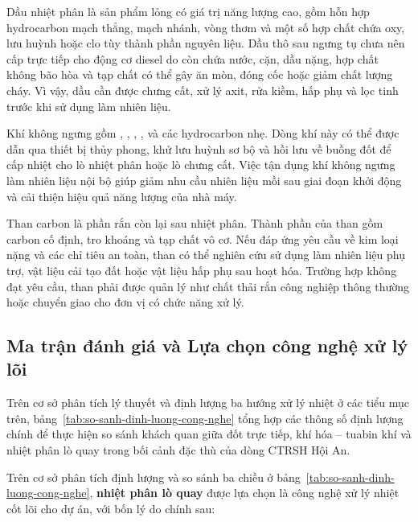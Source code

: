 \documentclass[../main.tex]{subfiles}
\begin{document}
Dầu nhiệt phân là sản phẩm lỏng có giá trị năng lượng cao, gồm hỗn hợp hydrocarbon mạch thẳng, mạch nhánh, vòng thơm và một số hợp chất chứa oxy, lưu huỳnh hoặc clo tùy thành phần nguyên liệu. Dầu thô sau ngưng tụ chưa nên cấp trực tiếp cho động cơ diesel do còn chứa nước, cặn, dầu nặng, hợp chất không bão hòa và tạp chất có thể gây ăn mòn, đóng cốc hoặc giảm chất lượng cháy. Vì vậy, dầu cần được chưng cất, xử lý axit, rửa kiềm, hấp phụ và lọc tinh trước khi sử dụng làm nhiên liệu.

Khí không ngưng gồm , , , ,  và các hydrocarbon nhẹ. Dòng khí này có thể được dẫn qua thiết bị thủy phong, khử lưu huỳnh sơ bộ và hồi lưu về buồng đốt để cấp nhiệt cho lò nhiệt phân hoặc lò chưng cất. Việc tận dụng khí không ngưng làm nhiên liệu nội bộ giúp giảm nhu cầu nhiên liệu mồi sau giai đoạn khởi động và cải thiện hiệu quả năng lượng của nhà máy.

Than carbon là phần rắn còn lại sau nhiệt phân. Thành phần của than gồm carbon cố định, tro khoáng và tạp chất vô cơ. Nếu đáp ứng yêu cầu về kim loại nặng và các chỉ tiêu an toàn, than có thể nghiên cứu sử dụng làm nhiên liệu phụ trợ, vật liệu cải tạo đất hoặc vật liệu hấp phụ sau hoạt hóa. Trường hợp không đạt yêu cầu, than phải được quản lý như chất thải rắn công nghiệp thông thường hoặc chuyển giao cho đơn vị có chức năng xử lý.

\subsection{Ma trận đánh giá và Lựa chọn công nghệ xử lý lõi}
\label{sec:so-sanh-va-lua-chon}

Trên cơ sở phân tích lý thuyết và định lượng ba hướng xử lý nhiệt ở các tiểu mục trên, bảng~\ref{tab:so-sanh-dinh-luong-cong-nghe} tổng hợp các thông số định lượng chính để thực hiện so sánh khách quan giữa đốt trực tiếp, khí hóa -- tuabin khí và nhiệt phân lò quay trong bối cảnh đặc thù của dòng CTRSH Hội An.

Trên cơ sở phân tích định lượng và so sánh ba chiều ở bảng~\ref{tab:so-sanh-dinh-luong-cong-nghe}, \textbf{nhiệt phân lò quay} được lựa chọn là công nghệ xử lý nhiệt cốt lõi cho dự án, với bốn lý do chính sau:
\end{document}

